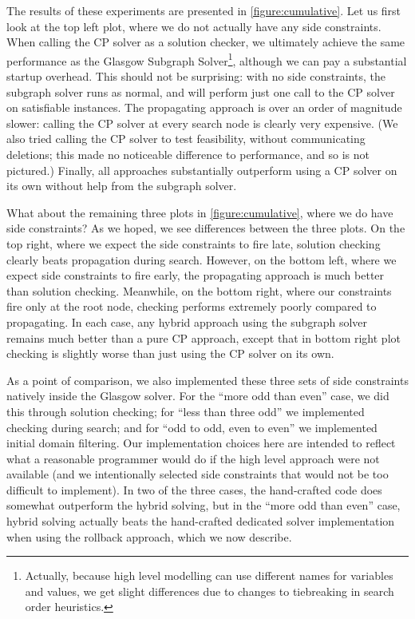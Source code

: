 \documentclass[runningheads]{llncs}
\begin{document}
The results of these experiments are presented in \cref{figure:cumulative}. Let us first look at the
top left plot, where we do not actually have any side constraints. When calling the CP solver as a
solution checker, we ultimately achieve the same performance as the Glasgow Subgraph
Solver\footnote{Actually, because high level modelling can use different names for variables and
values, we get slight differences due to changes to tiebreaking in search order heuristics.},
although we can pay a substantial startup overhead. This should not be surprising: with no side
constraints, the subgraph solver runs as normal, and will perform just one call to the CP solver on
satisfiable instances. The propagating approach is over an order of magnitude slower: calling the CP
solver at every search node is clearly very expensive. (We also tried calling the CP solver to test
feasibility, without communicating deletions; this made no noticeable difference to performance, and
so is not pictured.) Finally, all approaches substantially outperform using a CP solver on its own
without help from the subgraph solver.

What about the remaining three plots in \cref{figure:cumulative}, where we do have side constraints?
As we hoped, we see differences between the three plots. On the top right, where we expect the side
constraints to fire late, solution checking clearly beats propagation during search. However, on the
bottom left, where we expect side constraints to fire early, the propagating approach is much better
than solution checking. Meanwhile, on the bottom right, where our constraints fire only at the root
node, checking performs extremely poorly compared to propagating. In each case, any hybrid approach using
the subgraph solver remains much better than a pure CP approach, except that in bottom right plot
checking is slightly worse than just using the CP solver on its own.

As a point of comparison, we also implemented these three sets of side constraints natively inside
the Glasgow solver. For the ``more odd than even'' case, we did this through solution checking; for
``less than three odd'' we implemented checking during search; and for ``odd to odd, even to even''
we implemented initial domain filtering. Our implementation choices here are intended to reflect what a
reasonable programmer would do if the high level approach were not available (and we intentionally
selected side constraints that would not be too difficult to implement). In two of the three cases,
the hand-crafted code does somewhat outperform the hybrid solving, but in the ``more odd than even''
case, hybrid solving actually beats the hand-crafted dedicated solver implementation when using the
rollback approach, which we now describe.
\end{document}
